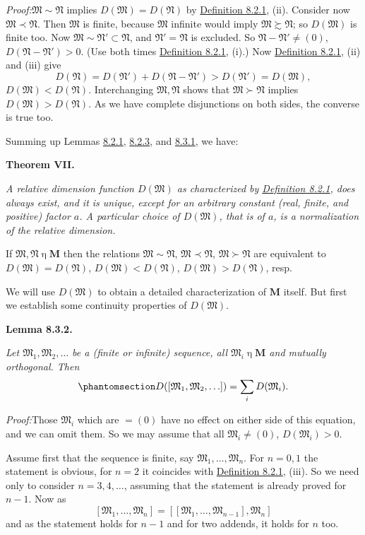 \documentclass[12pt,b5paper,twoside]{article}
\newcommand{\M}{\mathbf M}
\newcommand{\Lemma}[1]{%
  \par\smallskip\noindent\phantomsection\label{lem:#1}\textbf{Lemma #1.}\enspace
}
\newcommand{\MainTheorem}[1]{%
  \par\smallskip\noindent\phantomsection\label{thm:#1}\textbf{Theorem #1.}\enspace
}
\newcommand{\Proof}{\par\noindent\textit{Proof:}\enspace}
\newcommand{\defref}[1]{\hyperref[def:#1]{Definition #1}}
\begin{document}
\Proof $\mathfrak M\sim\mathfrak N$ implies
$D(\mathfrak M)=D(\mathfrak N)$ by \defref{8.2.1}, (ii). Consider now
$\mathfrak M\prec\mathfrak N$. Then $\mathfrak M$ is finite, because
$\mathfrak M$ infinite would imply $\mathfrak M\succsim\mathfrak N$; so
$D(\mathfrak M)$ is finite too. Now
$\mathfrak M\sim\mathfrak N'\subset\mathfrak N$, and
$\mathfrak N'=\mathfrak N$ is excluded. So
$\mathfrak N-\mathfrak N'\ne(0)$,
$D(\mathfrak N-\mathfrak N')>0$. (Use both times \defref{8.2.1}, (i).) Now
\defref{8.2.1}, (ii) and (iii) give
\[
 D(\mathfrak N)=D(\mathfrak N')+D(\mathfrak N-\mathfrak N')
 >D(\mathfrak N')=D(\mathfrak M),
\]
$D(\mathfrak M)<D(\mathfrak N)$. Interchanging $\mathfrak M,\mathfrak N$
shows that $\mathfrak M\succ\mathfrak N$ implies
$D(\mathfrak M)>D(\mathfrak N)$. As we have complete disjunctions on both
sides, the converse is true too.

Summing up Lemmas \hyperref[lem:8.2.1]{8.2.1},
\hyperref[lem:8.2.3]{8.2.3}, and \hyperref[lem:8.3.1]{8.3.1}, we have:

\MainTheorem{VII}
{\itshape
A relative dimension function $D(\mathfrak M)$ as characterized by
\defref{8.2.1}, does always exist, and it is unique, except for an arbitrary
constant (real, finite, and positive) factor $a$. A particular choice of
$D(\mathfrak M)$, that is of $a$, is a normalization of the relative dimension.

If $\mathfrak M,\mathfrak N\mathbin\eta\M$ then the relations
$\mathfrak M\sim\mathfrak N$, $\mathfrak M\prec\mathfrak N$,
$\mathfrak M\succ\mathfrak N$ are equivalent to
$D(\mathfrak M)=D(\mathfrak N)$, $D(\mathfrak M)<D(\mathfrak N)$,
 $D(\mathfrak M)>D(\mathfrak N)$, resp.}

We will use $D(\mathfrak M)$ to obtain a detailed characterization of $\M$
itself. But first we establish some continuity properties of $D(\mathfrak M)$.

\Lemma{8.3.2}
{\itshape
Let $\mathfrak M_1,\mathfrak M_2,\ldots$ be a (finite or infinite) sequence,
all $\mathfrak M_i\mathbin\eta\M$ and mutually orthogonal. Then
\begin{equation*}
 \phantomsection\label{eq:8.3.1}
 D([\mathfrak M_1,\mathfrak M_2,\ldots])
 =\sum_iD(\mathfrak M_i).
\end{equation*}}

\Proof Those $\mathfrak M_i$ which are $=(0)$ have no effect on either side
of this equation, and we can omit them. So we may assume that all
$\mathfrak M_i\ne(0)$, $D(\mathfrak M_i)>0$.

Assume first that the sequence is finite, say
$\mathfrak M_1,\ldots,\mathfrak M_n$. For $n=0,1$ the statement is obvious,
for $n=2$ it coincides with \defref{8.2.1}, (iii). So we need only to consider
$n=3,4,\ldots$, assuming that the statement is already proved for $n-1$. Now
as
\[
 [\mathfrak M_1,\ldots,\mathfrak M_n]
 =[[\mathfrak M_1,\ldots,\mathfrak M_{n-1}],\mathfrak M_n]
\]
and as the statement holds for $n-1$ and for two addends, it holds for $n$ too.
\end{document}
